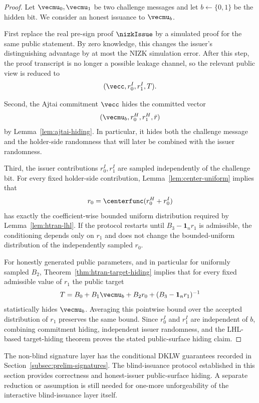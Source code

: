 \begin{proof}
Let $\vecmu_0,\vecmu_1$ be two challenge messages and let $b\gets\{0,1\}$ be the hidden bit.
We consider an honest issuance to $\vecmu_b$.

First replace the real pre-sign proof $\nizkIssue$ by a simulated proof for the same public statement.  By zero
knowledge, this changes the issuer's distinguishing advantage by at most the NIZK simulation error.  After this
step, the proof transcript is no longer a possible leakage channel, so the relevant public view is reduced to
\[
  (\vecc,r_0^I,r_1^I,T).
\]

Second, the Ajtai commitment $\vecc$ hides the committed vector
\[
  (\vecmu_b,r_0^H,r_1^H,\bar r)
\]
by Lemma~\ref{lem:ajtai-hiding}.  In particular, it hides both the challenge message and the holder-side
randomness that will later be combined with the issuer randomness.

Third, the issuer contributions $r_0^I,r_1^I$ are sampled independently of the challenge bit.  For every fixed
holder-side contribution, Lemma~\ref{lem:center-uniform} implies that
\[
  r_0=\centerfunc(r_0^H+r_0^I)
\]
has exactly the coefficient-wise bounded uniform distribution required by Lemma~\ref{lem:htran-lhl}.  If the
protocol restarts until $B_3-\mathbf 1_n r_1$ is admissible, the conditioning depends only on $r_1$ and does
not change the bounded-uniform distribution of the independently sampled $r_0$.

For honestly generated public parameters, and in particular for uniformly sampled $B_2$,
Theorem~\ref{thm:htran-target-hiding} implies that for every fixed admissible value of $r_1$ the public target
\[
  T=B_0+B_1\vecmu_b+B_2r_0+(B_3-\mathbf 1_n r_1)^{-1}
\]
statistically hides $\vecmu_b$.  Averaging this pointwise bound over the accepted distribution of $r_1$ preserves
the same bound.  Since $r_0^I$ and $r_1^I$ are independent of $b$, combining commitment hiding, independent
issuer randomness, and the LHL-based target-hiding theorem proves the stated public-surface hiding claim.
\end{proof}

\begin{remark}\label{rem:bs-security-status}
The non-blind signature layer has the conditional DKLW guarantees recorded in
Section~\ref{subsec:prelim-signatures}.  The blind-issuance protocol established in this section provides
correctness and honest-issuer public-surface hiding.  A separate reduction or assumption is still needed for
one-more unforgeability of the
interactive blind-issuance layer itself.
\end{remark}
